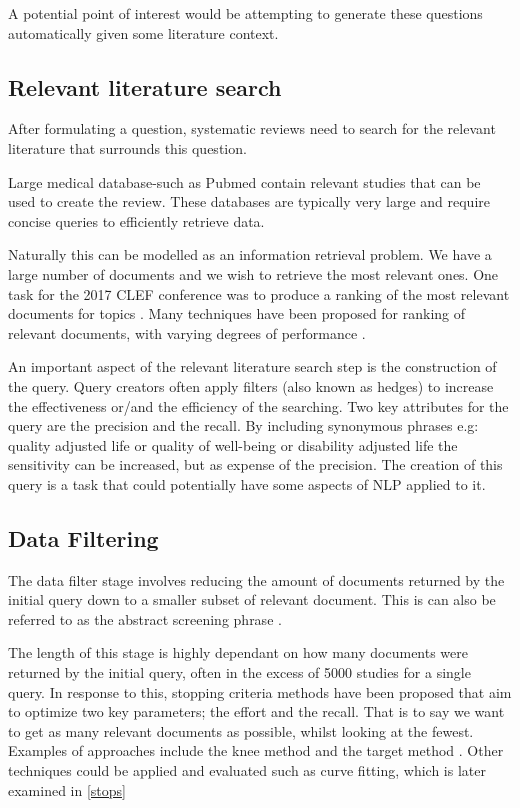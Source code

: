 A potential point of interest would be attempting to generate these questions automatically given some literature context.

\subsection{Relevant literature search}

After formulating a question, systematic reviews need to search for the relevant literature that surrounds this question.

Large medical database-such as Pubmed \cite{pubmed} contain relevant studies that can be used to create the review. These databases are typically very large and require concise queries to efficiently retrieve data.

Naturally this can be modelled as an information retrieval problem. We have a large number of documents and we wish to retrieve the most relevant ones. One task for the 2017 CLEF conference was to produce a ranking of the most relevant documents for topics \cite{Kanoulas12017}. Many techniques have been proposed for ranking of relevant documents, with varying degrees of performance \cite{Alharbi2017} \cite{Gordon2017} \cite{Eunkyung2017}.

An important aspect of the relevant literature search step is the construction of the query. Query creators often apply filters (also known as hedges) to increase the effectiveness or/and the efficiency of the searching. Two key attributes for the query are the precision and the recall. By including synonymous phrases e.g: quality adjusted life or quality of well-being or disability adjusted life the sensitivity can be increased, but as expense of the precision. The creation of this query is a task that could potentially have some aspects of NLP applied to it.


\subsection{Data Filtering}

The data filter stage involves reducing the amount of documents returned by the initial query down to a smaller subset of relevant document. This is can also be referred to as the abstract screening phrase \cite{Kanoulas12017}.

The length of this stage is highly dependant on how many documents were returned by the initial query, often in the excess of 5000 studies for a single query. In response to this, stopping criteria methods have been proposed that aim to optimize two key parameters; the effort and the recall. That is to say we want to get as many relevant documents as possible, whilst looking at the fewest. Examples of approaches include the knee method \cite{Satopa11} and the target method \cite{Cormack2016}. Other techniques could be applied and evaluated such as curve fitting, which is later examined in \ref{stops}

